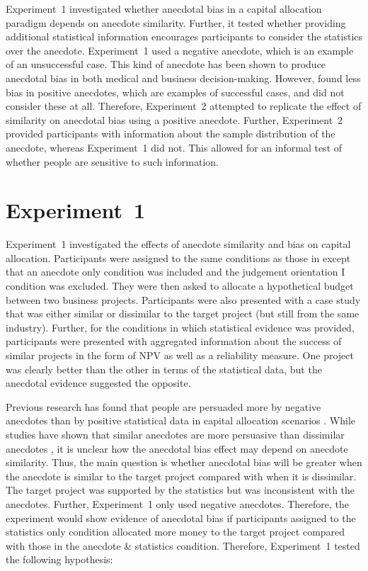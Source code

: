 \documentclass[a4paper, nobind]{templates/ociamthesis}
\theoremstyle{definition}
\theoremstyle{definition}
\theoremstyle{definition}
\theoremstyle{definition}
\theoremstyle{remark}
\begin{document}
Experiment~1 investigated whether anecdotal bias in a capital allocation
paradigm depends on anecdote similarity. Further, it tested whether providing
additional statistical information encourages participants to consider the
statistics over the anecdote. Experiment~1 used a negative anecdote, which is an
example of an unsuccessful case. This kind of anecdote has been shown to produce
anecdotal bias in both medical \autocite{jaramillo2019} and business \autocite{wainberg2018}
decision-making. However, \textcite{jaramillo2019} found less bias in positive anecdotes,
which are examples of successful cases, and \textcite{wainberg2018} did not consider these
at all. Therefore, Experiment~2 attempted to replicate the effect of similarity
on anecdotal bias using a positive anecdote. Further, Experiment~2 provided
participants with information about the sample distribution of the anecdote,
whereas Experiment~1 did not. This allowed for an informal test of whether
people are sensitive to such information.

\hypertarget{anecdotes-1}{%
\section{Experiment~1}\label{anecdotes-1}}

Experiment~1 investigated the effects of anecdote similarity and bias on
capital allocation. Participants were assigned to the same conditions as those
in \textcite{wainberg2018} except that an anecdote only condition was included and the
judgement orientation I condition was excluded. They were then asked to allocate
a hypothetical budget between two business projects. Participants were also
presented with a case study that was either similar or dissimilar to the target
project (but still from the same industry). Further, for the conditions in which
statistical evidence was provided, participants were presented with aggregated
information about the success of similar projects in the form of NPV as well as
a reliability measure. One project was clearly better than the other in terms of
the statistical data, but the anecdotal evidence suggested the opposite.

Previous research has found that people are persuaded more by negative anecdotes
than by positive statistical data in capital allocation scenarios
\autocite{wainberg2018}. While studies have shown that similar anecdotes are more
persuasive than dissimilar anecdotes \autocite[Study~3]{hoeken2009}, it is unclear how
the anecdotal bias effect may depend on anecdote similarity. Thus, the main
question is whether anecdotal bias will be greater when the anecdote is similar
to the target project compared with when it is dissimilar. The target project
was supported by the statistics but was inconsistent with the anecdotes.
Further, Experiment~1 only used negative anecdotes. Therefore, the experiment
would show evidence of anecdotal bias if participants assigned to the statistics
only condition allocated more money to the target project compared with those in
the anecdote \& statistics condition. Therefore, Experiment~1 tested the
following hypothesis:
\end{document}
